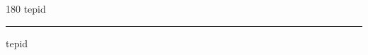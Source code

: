 
\begin{frame}
\begin{center}
\begin{turn}{180}
{\fontsize{2.5cm}{1em}\selectfont tepid}
\end{turn}
\vspace{1em}\par  
\hrule
\vspace{1em}\par  
{\fontsize{2.5cm}{1em}\selectfont tepid}
\end{center}
\end{frame}
